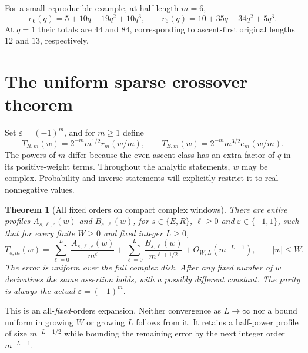 \documentclass[11pt,letterpaper]{article}
\numberwithin{equation}{section}
\newtheorem{theorem}{Theorem}[section]
\theoremstyle{remark}\newtheorem{remark}[theorem]{Remark}
\newcommand{\eps}{\varepsilon}
\begin{document}
For a small reproducible example, at half-length $m=6$,
\[
 e_6(q)=5+10q+19q^2+10q^3,\qquad
 r_6(q)=10+35q+34q^2+5q^3.
\]
At $q=1$ their totals are $44$ and $84$, corresponding to ascent-first
original lengths $12$ and $13$, respectively.

\section{The uniform sparse crossover theorem}\label{abx:fp:sec:uniform}
Set $\eps=(-1)^m$, and for $m\ge1$ define
\begin{equation}\label{abx:fp:eq:T}
 T_{R,m}(w)=2^{-m}m^{1/2}r_m(w/m),\qquad
 T_{E,m}(w)=2^{-m}m^{3/2}e_m(w/m).
\end{equation}
The powers of $m$ differ because the even ascent class has an extra
factor of $q$ in its positive-weight terms. Throughout the analytic
statements, $w$ may be complex. Probability and inverse statements
will explicitly restrict it to real nonnegative values.

\begin{theorem}[All fixed orders on compact complex windows]\label{abx:fp:thm:uniform}
There are entire profiles $A_{s,\ell,\eps}(w)$ and $B_{s,\ell}(w)$,
for $s\in\{E,R\}$, $\ell\ge0$ and $\eps\in\{-1,1\}$, such that
for every finite $W\ge0$ and fixed integer $L\ge0$,
\begin{equation}\label{abx:fp:eq:uniform}
 T_{s,m}(w)=\sum_{\ell=0}^{L}\frac{A_{s,\ell,\eps}(w)}{m^\ell}
       +\sum_{\ell=0}^{L}\frac{B_{s,\ell}(w)}{m^{\ell+1/2}}
       +O_{W,L}(m^{-L-1}),\qquad |w|\le W.
\end{equation}
The error is uniform over the full complex disk. After any fixed number
of $w$ derivatives the same assertion holds, with a possibly different
constant. The parity is always the actual $\eps=(-1)^m$.
\end{theorem}
This is an all-\emph{fixed}-orders expansion. Neither convergence as
$L\to\infty$ nor a bound uniform in growing $W$ or growing $L$ follows
from it. It retains a half-power profile of size $m^{-L-1/2}$ while
bounding the remaining error by the next integer order $m^{-L-1}$.
\end{document}
